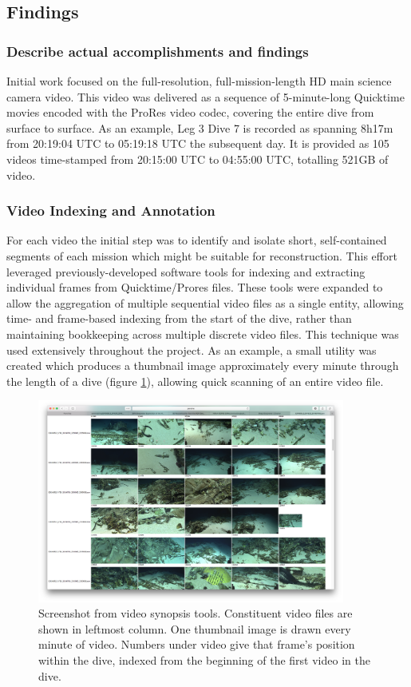 \documentclass[letterpaper,12pt]{article}
\begin{document}
\subsection{Findings}
\subsubsection*{Describe actual accomplishments and findings}


Initial work focused on the full-resolution, full-mission-length HD main science camera video.  This video was delivered as a sequence of 5-minute-long Quicktime movies encoded with the ProRes video codec, covering the entire dive from surface to surface.    As an example, Leg 3 Dive 7 is recorded as spanning 8h17m from 20:19:04 UTC to 05:19:18 UTC the subsequent day.  It is provided as 105 videos time-stamped from 20:15:00 UTC to 04:55:00 UTC, totalling 521GB of video. 

\subsubsection{Video Indexing and Annotation}

For each video the initial step was to identify and isolate short, self-contained segments of each mission which might be suitable for reconstruction.   This effort leveraged previously-developed software tools for indexing and extracting individual frames from Quicktime/Prores files.  These tools were expanded to allow the aggregation of multiple sequential video files as a single entity, allowing time- and frame-based indexing from the start of the dive, rather than maintaining bookkeeping across multiple discrete video files.  This technique was used extensively throughout the project.  As an example, a small utility was created which produces a thumbnail image approximately every minute through the length of a dive (figure \ref{img:thumbnails}), allowing quick scanning of an entire video file.

\begin{figure}
    \centering
    \includegraphics[width=0.9\textwidth]{images/thumbnailer_screenshot.png}
    \caption{Screenshot from video synopsis tools.   Constituent video files are shown in leftmost column.   One thumbnail image is drawn every minute of video.  Numbers under video give that frame's position within the dive, indexed from the beginning of the first video in the dive.}
    \label{img:thumbnails}
\end{figure}
\end{document}
